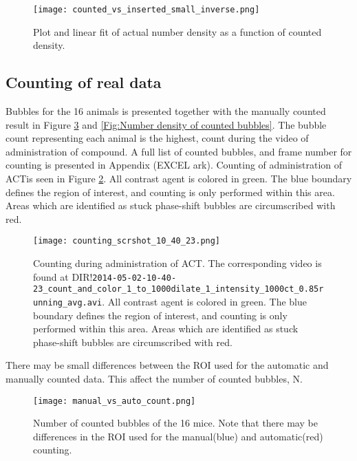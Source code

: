 \begin{figure}[h]
  \centering
  \texttt{[image: counted\_vs\_inserted\_small\_inverse.png]}
  \caption{Plot and linear fit of actual number density as a function of counted density.}
  \label{Fig:counted_vs_inserted_inverse}
\end{figure}

\subsection{Counting of real data}
Bubbles for the 16 animals is presented together with the manually counted result in Figure \ref{Fig:Number of counted bubbles} and \ref{Fig:Number density of counted bubbles}. The bubble count representing each animal is the highest, count during the video of administration of compound. A full list of counted bubbles, and frame number for counting is presented in Appendix (EXCEL ark). Counting of administration of ACT\texttrademark is seen in Figure \ref{Fig:counting_administration}. All contrast agent is colored in green. The blue boundary defines the region of interest, and counting is only performed within this area. Areas which are identified as stuck phase-shift bubbles are circumscribed with red.

\begin{figure}[h]
  \centering
  \texttt{[image: counting\_scrshot\_10\_40\_23.png]}
  \cprotect\caption{Counting during administration of ACT\texttrademark. The corresponding video is found at DIR!\verb|2014-05-02-10-40-23_count_and_color_1_to_1000dilate_1_intensity_1000ct_0.85running_avg.avi|. All contrast agent is colored in green. The blue boundary defines the region of interest, and counting is only performed within this area. Areas which are identified as stuck phase-shift bubbles are circumscribed with red.}
  \label{Fig:counting_administration}
\end{figure}

There may be small differences between the ROI used for the automatic and manually counted data. This affect the number of counted bubbles, N.

\begin{figure}[h]
  \centering
  \texttt{[image: manual\_vs\_auto\_count.png]}
  \caption{Number of counted bubbles of the 16 mice. Note that there may be differences in the ROI used for the manual(blue) and automatic(red) counting.}
  \label{Fig:Number of counted bubbles}
\end{figure}

